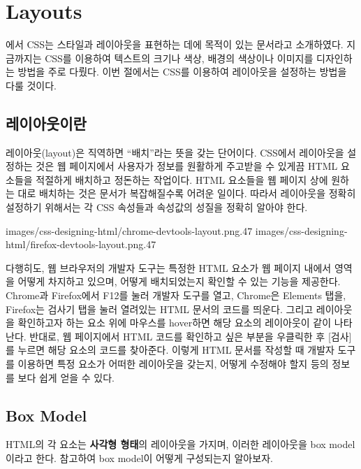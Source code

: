 \section{Layouts} \label{sect:layouts}

에서 CSS는 스타일과 레이아웃을 표현하는 데에 목적이 있는 문서라고 소개하였다. 지금까지는 CSS를 이용하여 텍스트의 크기나 색상, 배경의 색상이나 이미지를 디자인하는 방법을 주로 다뤘다. 이번 절에서는 CSS를 이용하여 레이아웃을 설정하는 방법을 다룰 것이다.

\subsection*{레이아웃이란}
레이아웃(layout)은 직역하면 ``배치''라는 뜻을 갖는 단어이다. CSS에서 레이아웃을 설정하는 것은 웹 페이지에서 사용자가 정보를 원활하게 주고받을 수 있게끔 HTML 요소들을 적절하게 배치하고 정돈하는 작업이다. HTML 요소들을 웹 페이지 상에 원하는 대로 배치하는 것은 문서가 복잡해질수록 어려운 일이다. 따라서 레이아웃을 정확히 설정하기 위해서는 각 CSS 속성들과 속성값의 성질을 정확히 알아야 한다.

    {
            {images/css-designing-html/chrome-devtools-layout.png}{.47}
            {images/css-designing-html/firefox-devtools-layout.png}{.47}
    }

다행히도, 웹 브라우저의 개발자 도구는 특정한 HTML 요소가 웹 페이지 내에서 영역을 어떻게 차지하고 있으며, 어떻게 배치되었는지 확인할 수 있는 기능을 제공한다. Chrome과 Firefox에서 F12를 눌러 개발자 도구를 열고, Chrome은 Elements 탭을, Firefox는 검사기 탭을 눌러 열려있는 HTML 문서의 코드를 띄운다. 그리고 레이아웃을 확인하고자 하는 요소 위에 마우스를 hover하면 해당 요소의 레이아웃이 \과 같이 나타난다. 반대로, 웹 페이지에서 HTML 코드를 확인하고 싶은 부분을 우클릭한 후 [검사]를 누르면 해당 요소의 코드를 찾아준다. 이렇게 HTML 문서를 작성할 때 개발자 도구를 이용하면 특정 요소가 어떠한 레이아웃을 갖는지, 어떻게 수정해야 할지 등의 정보를 보다 쉽게 얻을 수 있다.

\subsection*{Box Model}
HTML의 각 요소는 \textbf{사각형 형태}의 레이아웃을 가지며, 이러한 레이아웃을 box model이라고 한다. \을 참고하여 box model이 어떻게 구성되는지 알아보자.

